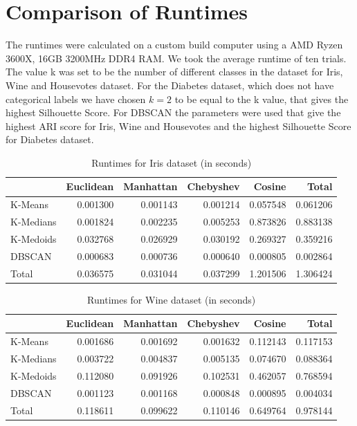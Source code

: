 \section{Comparison of Runtimes}
The runtimes were calculated on a custom build computer using a AMD Ryzen 3600X, 16GB 3200MHz DDR4 RAM. We took the average runtime of ten trials. The value k was set to be the number of different classes in the dataset for Iris, Wine and Housevotes dataset. For the Diabetes dataset, which does not have categorical labels we have chosen $k=2$ to be equal to the k value, that gives the highest Silhouette Score. For DBSCAN the parameters were used that give the highest ARI score for Iris, Wine and Housevotes and the highest Silhouette Score for Diabetes dataset. \\

\begin{table}[H]
	\begin{tabular}{lrrrr|r}
		\toprule
		{} &  Euclidean &  Manhattan &  Chebyshev &    Cosine &     Total \\
		\midrule
		K-Means   &   0.001300 &   0.001143 &   0.001214 &  0.057548 &  0.061206 \\
		K-Medians &   0.001824 &   0.002235 &   0.005253 &  0.873826 &  0.883138 \\
		K-Medoids &   0.032768 &   0.026929 &   0.030192 &  0.269327 &  0.359216 \\
		DBSCAN    &   0.000683 &   0.000736 &   0.000640 &  0.000805 &  0.002864 \\
		\midrule
		Total     &   0.036575 &   0.031044 &   0.037299 &  1.201506 &  1.306424 \\
		\bottomrule
		
	\end{tabular}
	\caption{Runtimes for Iris dataset (in seconds)}
\end{table}


\begin{table}[H]
	\begin{tabular}{lrrrr|r}
		\toprule
		{} &  Euclidean &  Manhattan &  Chebyshev &    Cosine &     Total \\
		\midrule
		K-Means   &   0.001686 &   0.001692 &   0.001632 &  0.112143 &  0.117153 \\
		K-Medians &   0.003722 &   0.004837 &   0.005135 &  0.074670 &  0.088364 \\
		K-Medoids &   0.112080 &   0.091926 &   0.102531 &  0.462057 &  0.768594 \\
		DBSCAN    &   0.001123 &   0.001168 &   0.000848 &  0.000895 &  0.004034 \\
		\midrule
		Total     &   0.118611 &   0.099622 &   0.110146 &  0.649764 &  0.978144 \\
		\bottomrule
		
	\end{tabular} 
	\caption{Runtimes for Wine dataset (in seconds)}
\end{table}


